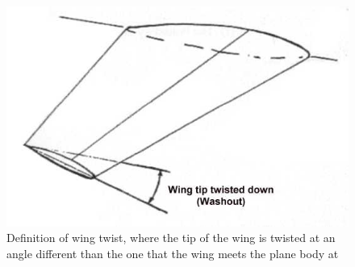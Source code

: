 \documentclass[11pt]{ucthesis}
\begin{document}
\begin{figure}[h]
\centering
\includegraphics[width=0.75\linewidth]{./Figures/twist.jpg}
\caption{Definition of wing twist, where the tip of the wing is twisted at an angle different than the one that the wing meets the plane body at}
\label{fig:twist}
\end{figure}
\end{document}
